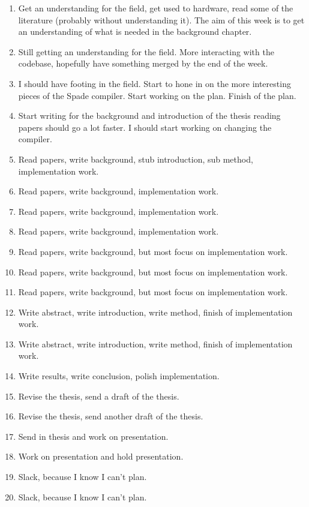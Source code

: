 \documentclass[msc,lith,english]{liuthesis}
\begin{document}
\begin{enumerate}
  \item \past Get an understanding for the field, get used to hardware, read some of the literature (probably without understanding it). The aim of this week is to get an understanding of what is needed in the background chapter.
  \item \past Still getting an understanding for the field. More interacting with the codebase, hopefully have something merged by the end of the week. 
  \item \curr I should have footing in the field. Start to hone in on the more interesting pieces of the Spade compiler. Start working on the plan. Finish of the plan. 
  \item \curr Start writing for the background and introduction of the thesis reading papers should go a lot faster. I should start working on changing the compiler. 
  \item \futr Read papers, write background, stub introduction, sub method, implementation work.  
  \item \futr Read papers, write background, implementation work. 
  \item \futr Read papers, write background, implementation work. 
  \item \futr Read papers, write background, implementation work.  
  \item \futr Read papers, write background, but most focus on implementation work.
  \item \futr Read papers, write background, but most focus on implementation work.
  \item \futr Read papers, write background, but most focus on implementation work.
  \item \futr Write abstract, write introduction, write method, finish of implementation work.  
  \item \futr Write abstract, write introduction, write method, finish of implementation work. 
  \item \futr Write results, write conclusion, polish implementation.  
  \item \futr Revise the thesis, send a draft of the thesis.
  \item \futr Revise the thesis, send another draft of the thesis.
  \item \futr Send in thesis and work on presentation.  
  \item \futr Work on presentation and hold presentation.  
  \item \futr Slack, because I know I can't plan.
  \item \futr Slack, because I know I can't plan.
\end{enumerate}
\end{document}

